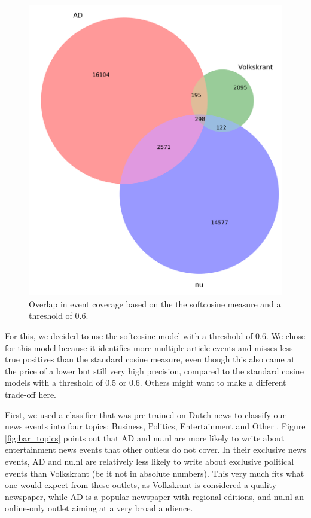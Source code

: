 \documentclass[a4paper,man,natbib,floatsintext,mask]{apa6}
\begin{document}
\begin{figure}[h!]
  \centering
  \includegraphics[width=.6\linewidth]{figures/vennsoft06.png}  
    \caption{Overlap in event coverage based on the the softcosine measure and a threshold of 0.6.}
    \label{fig:venn}
\end{figure}


For this, we decided to use the softcosine model with a threshold of 0.6. We chose for this model because it identifies more multiple-article events and misses less true positives than the standard cosine measure, even though this also came at the price of a lower but still very high precision, compared to the standard cosine models with a threshold of 0.5 or 0.6.
Others might want to make a different trade-off here.

First, we used a classifier that was pre-trained on Dutch news to classify our news events into four topics: Business, Politics, Entertainment and Other \citep{vermeer2018}. Figure \ref{fig:bar_topics} points out that AD and nu.nl are more likely to write about entertainment news events that other outlets do not cover.
In their exclusive news events, AD and nu.nl are relatively less likely to write about exclusive political events than Volkskrant (be it not in absolute numbers).
This very much fits what one would expect from these outlets, as Volkskrant is considered a quality newspaper, while AD is a popular newspaper with regional editions, and nu.nl an online-only outlet aiming at a very broad audience. 
\end{document}
